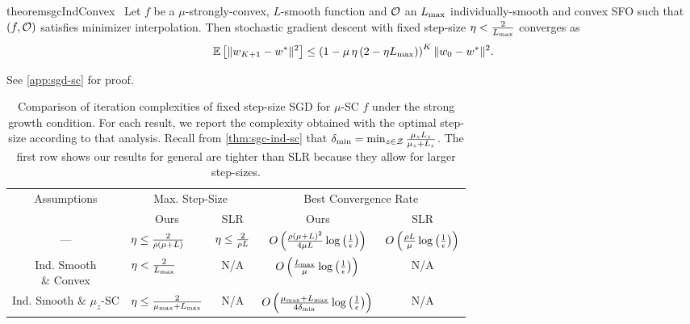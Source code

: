 \begin{restatable}{theorem}{sgcIndConvex}~\label{thm:sgc-ind-convex}
    Let \( f \) be a \( \mu \)-strongly-convex, \( L \)-smooth function and \( \oracle{} \) an \( \Lmax \) individually-smooth and convex \ac{SFO} such that \( \rbr{f, \oracle{}} \) satisfies minimizer interpolation.
    Then stochastic gradient descent with fixed step-size \( \eta < \frac{2}{\Lmax} \) converges as
    \[ \E\sbr{\norm{\w_{K+1} - \wopt}^2} \leq \rbr{1 - \mu \, \eta \rbr{2 - \eta \Lmax}}^K \norm{\w_0 - \wopt}^2. \]
\end{restatable}
\noindent See \autoref{app:sgd-sc} for proof.\hfill \break

\begin{table}[t]
    \centering
    \begin{tabular}{c l l c c  }\toprule
        \multirow{2}{*}{Assumptions} & \multicolumn{2}{c}{Max. Step-Size}  & \multicolumn{2}{c}{Best Convergence Rate}\\%
        \cmidrule(lr){2-3} \cmidrule(l){4-5}
                 & \multicolumn{1}{c}{Ours} & \multicolumn{1}{c}{SLR} & \multicolumn{1}{c}{Ours} & \multicolumn{1}{c}{SLR}\\ \midrule
     — & \( \eta \leq \frac{2}{\sgc\rbr{\mu + L}} \)%
                 & \( \eta \leq \frac{2}{\sgc L} \)%
                 & \( O\rbr{\frac{\rho{(\mu + L)}^2}{4\mu L} \log\rbr{\inv{\epsilon}}} \)%
                 & \( O\rbr{\frac{\rho L}{\mu} \log\rbr{\inv{\epsilon}}} \) \\ \addlinespace
    \makecell{Ind. Smooth \\ \& Convex}%
                 & \( \eta < \frac{2}{\Lmax} \)%
                 & \multicolumn{1}{c}{N/A}%
                 & \( O\rbr{\frac{\Lmax}{\mu}\log\rbr{\inv{\epsilon}}} \)%
                 & \multicolumn{1}{c}{N/A}\\ \addlinespace 
    \makecell{Ind. Smooth \\ \& \(\mu_z\)-SC}%
                 & \( \eta \leq \frac{2}{\mumax + \Lmax} \)%
                 & \multicolumn{1}{c}{N/A}%
                 & \( O\rbr{\frac{\mumax + \Lmax}{4 \delta_{\text{min}}} \log\rbr{\frac{1}{\epsilon}}} \)%
                 & \multicolumn{1}{c}{N/A} \\ \bottomrule 
    \end{tabular}
    \caption{Comparison of iteration complexities of fixed step-size \ac{SGD} for \( \mu \)-SC \( f \) under the strong growth condition. For each result, we report the complexity obtained with the optimal step-size according to that analysis. Recall from \autoref{thm:sgc-ind-sc} that \( \delta_{\text{min}} = \min_{\z \in \calZ} \frac{\mu_\z L_\z}{\mu_\z + L_\z} \). The first row shows our results for general \oracle{} are tighter than SLR \citep{schmidt2013fast} because they allow for larger step-sizes.}%
    \label{table:sgd-sc-comparison}
\end{table}

